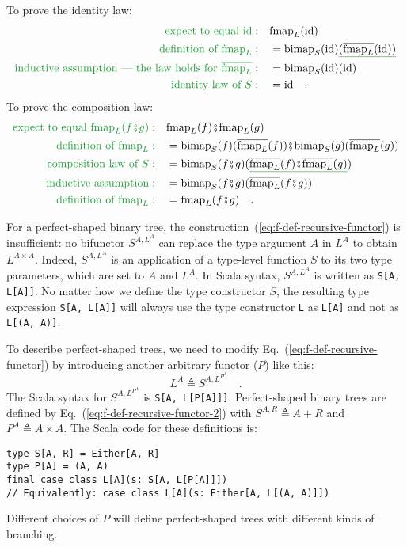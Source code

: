 To prove the identity law:
\begin{align*}
{\color{greenunder}\text{expect to equal }\text{id}:}\quad & \text{fmap}_{L}(\text{id})\\
{\color{greenunder}\text{definition of }\text{fmap}_{L}:}\quad & =\text{bimap}_{S}(\text{id})\gunderline{(\overline{\text{fmap}_{L}}(\text{id}))}\\
{\color{greenunder}\text{inductive assumption --- the law holds for }\overline{\text{fmap}_{L}}:}\quad & =\text{bimap}_{S}(\text{id})(\text{id})\\
{\color{greenunder}\text{identity law of }S:}\quad & =\text{id}\quad.
\end{align*}
To prove the composition law:
\begin{align*}
{\color{greenunder}\text{expect to equal }\text{fmap}_{L}(f\bef g):}\quad & \text{fmap}_{L}(f)\bef\text{fmap}_{L}(g)\\
{\color{greenunder}\text{definition of }\text{fmap}_{L}:}\quad & =\text{bimap}_{S}(f)(\overline{\text{fmap}_{L}}(f))\bef\text{bimap}_{S}(g)(\overline{\text{fmap}_{L}}(g))\\
{\color{greenunder}\text{composition law of }S:}\quad & =\text{bimap}_{S}(f\bef g)(\gunderline{\overline{\text{fmap}_{L}}(f)\bef\overline{\text{fmap}_{L}}(g)})\\
{\color{greenunder}\text{inductive assumption}:}\quad & =\text{bimap}_{S}(f\bef g)(\overline{\text{fmap}_{L}}(f\bef g))\\
{\color{greenunder}\text{definition of }\text{fmap}_{L}:}\quad & =\text{fmap}_{L}(f\bef g)\quad.
\end{align*}

For a perfect-shaped binary tree, the construction~(\ref{eq:f-def-recursive-functor})
is insufficient: no bifunctor $S^{A,L^{A}}$ can replace the type
argument $A$ in $L^{A}$ to obtain $L^{A\times A}$. Indeed, $S^{A,L^{A}}$
is an application of a type-level function $S$ to its two type parameters,
which are set to $A$ and $L^{A}$. In Scala syntax, $S^{A,L^{A}}$
is written as \lstinline!S[A, L[A]]!. No matter how we define the
type constructor $S$, the resulting type expression \lstinline!S[A, L[A]]!
will always use the type constructor \lstinline!L! as \lstinline!L[A]!
and not as \lstinline!L[(A, A)]!. 

To describe perfect-shaped trees, we need to modify Eq.~(\ref{eq:f-def-recursive-functor})
by introducing another arbitrary functor ($P$) like this:
\begin{equation}
L^{A}\triangleq S^{A,L^{P^{A}}}\quad.\label{eq:f-def-recursive-functor-2}
\end{equation}
The Scala syntax for $S^{A,L^{P^{A}}}$ is \lstinline!S[A, L[P[A]]]!.
Perfect-shaped binary trees are defined by Eq.~(\ref{eq:f-def-recursive-functor-2})
with $S^{A,R}\triangleq A+R$ and $P^{A}\triangleq A\times A$. The
Scala code for these definitions is:
\begin{lstlisting}
type S[A, R] = Either[A, R]
type P[A] = (A, A)
final case class L[A](s: S[A, L[P[A]]])
// Equivalently: case class L[A](s: Either[A, L[(A, A)]])
\end{lstlisting}
Different choices of $P$ will define perfect-shaped trees with different
kinds of branching.

